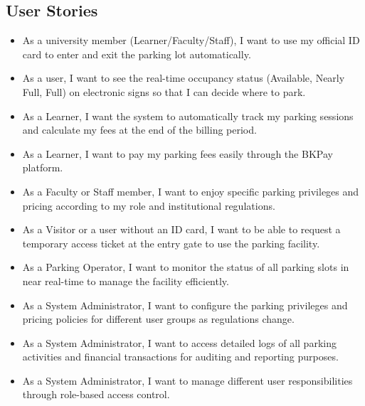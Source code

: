 \subsection{User Stories}
\begin{itemize}
    \item As a university member (Learner/Faculty/Staff), I want to use my official ID card to enter and exit the parking lot automatically.
    \item As a user, I want to see the real-time occupancy status (Available, Nearly Full, Full) on electronic signs so that I can decide where to park.
    \item As a Learner, I want the system to automatically track my parking sessions and calculate my fees at the end of the billing period.
    \item As a Learner, I want to pay my parking fees easily through the BKPay platform.
    \item As a Faculty or Staff member, I want to enjoy specific parking privileges and pricing according to my role and institutional regulations.
    \item As a Visitor or a user without an ID card, I want to be able to request a temporary access ticket at the entry gate to use the parking facility.
    \item As a Parking Operator, I want to monitor the status of all parking slots in near real-time to manage the facility efficiently.
    \item As a System Administrator, I want to configure the parking privileges and pricing policies for different user groups as regulations change.
    \item As a System Administrator, I want to access detailed logs of all parking activities and financial transactions for auditing and reporting purposes.
    \item As a System Administrator, I want to manage different user responsibilities through role-based access control.
\end{itemize}

